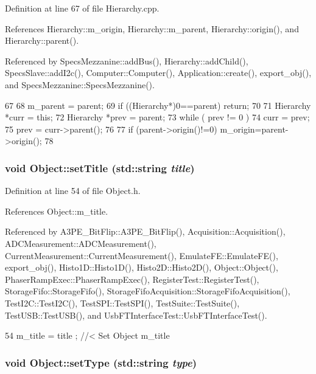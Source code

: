 Definition at line 67 of file Hierarchy.cpp.

References Hierarchy::m\_\-origin, Hierarchy::m\_\-parent, Hierarchy::origin(), and Hierarchy::parent().

Referenced by SpecsMezzanine::addBus(), Hierarchy::addChild(), SpecsSlave::addI2c(), Computer::Computer(), Application::create(), export\_\-obj(), and SpecsMezzanine::SpecsMezzanine().


\begin{DoxyCode}
67                                               {
68   m_parent = parent;
69   if ((Hierarchy*)0==parent) return;
70 
71   Hierarchy *curr = this;
72   Hierarchy *prev = parent;
73   while ( prev != 0 ){
74     curr = prev;
75     prev = curr->parent();
76   }
77   if (parent->origin()!=0) m_origin=parent->origin();
78 }
\end{DoxyCode}
\hypertarget{classObject_a89557dbbad5bcaa02652f5d7fa35d20f}{
\subsubsection[{setTitle}]{\setlength{\rightskip}{0pt plus 5cm}void Object::setTitle (std::string {\em title})}}
\label{classObject_a89557dbbad5bcaa02652f5d7fa35d20f}


Definition at line 54 of file Object.h.

References Object::m\_\-title.

Referenced by A3PE\_\-BitFlip::A3PE\_\-BitFlip(), Acquisition::Acquisition(), ADCMeasurement::ADCMeasurement(), CurrentMeasurement::CurrentMeasurement(), EmulateFE::EmulateFE(), export\_\-obj(), Histo1D::Histo1D(), Histo2D::Histo2D(), Object::Object(), PhaserRampExec::PhaserRampExec(), RegisterTest::RegisterTest(), StorageFifo::StorageFifo(), StorageFifoAcquisition::StorageFifoAcquisition(), TestI2C::TestI2C(), TestSPI::TestSPI(), TestSuite::TestSuite(), TestUSB::TestUSB(), and UsbFTInterfaceTest::UsbFTInterfaceTest().


\begin{DoxyCode}
54 { m_title = title ; } //< Set Object m_title
\end{DoxyCode}
\hypertarget{classObject_aae534cc9d982bcb9b99fd505f2e103a5}{
\subsubsection[{setType}]{\setlength{\rightskip}{0pt plus 5cm}void Object::setType (std::string {\em type})}}
\label{classObject_aae534cc9d982bcb9b99fd505f2e103a5}


